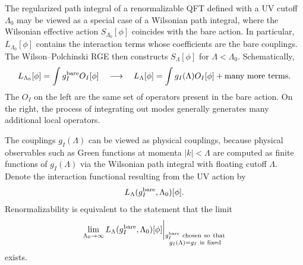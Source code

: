 The regularized path integral of a renormalizable QFT defined with a UV
cutoff \(\Lambda_0\) may be viewed as a special case of a Wilsonian path
integral, where the Wilsonian effective action \(S_{\Lambda_0}[\phi]\)
coincides with the bare action.  In particular, \(L_{\Lambda_0}[\phi]\)
contains the interaction terms whose coefficients are the bare couplings.
The Wilson--Polchinski RGE then constructs \(S_\Lambda[\phi]\) for
\(\Lambda<\Lambda_0\).  Schematically,
\[
  L_{\Lambda_0}[\phi]
  =
  \int g_I^{\rm bare}O_I[\phi]
  \quad\longrightarrow\quad
  L_\Lambda[\phi]
  =
  \int g_I(\Lambda)O_I[\phi]
  +\hbox{many more terms}.
\]
The \(O_I\) on the left are the same set of operators present in the bare
action.  On the right, the process of integrating out modes generally
generates many additional local operators.

The couplings \(g_I(\Lambda)\) can be viewed as physical couplings, because
physical observables such as Green functions at momenta \(|k|<\Lambda\)
are computed as finite functions of \(g_I(\Lambda)\) via the Wilsonian path
integral with floating cutoff \(\Lambda\).  Denote the interaction
functional resulting from the UV action by
\[
  L_\Lambda(g_I^{\rm bare},\Lambda_0)[\phi].
\]
Renormalizability is equivalent to the statement that the limit
\[
  \lim_{\Lambda_0\to\infty}
  L_\Lambda(g_I^{\rm bare},\Lambda_0)[\phi]
  \bigg|_{
    \substack{
      g_I^{\rm bare}\ {\rm chosen\ so\ that}\\
      g_I(\Lambda)=g_I\ {\rm is\ fixed}
    }}
\]
exists.


